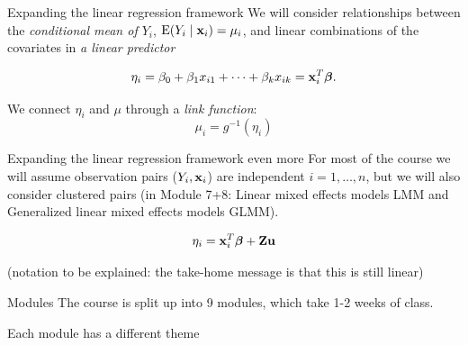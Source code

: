 \documentclass[
  ignorenonframetext,
]{beamer}
\begin{document}
\begin{frame}
\begin{block}{Expanding the linear regression framework}
\protect\hypertarget{expanding-the-linear-regression-framework}{}
We will consider relationships between the \emph{conditional mean of
\(Y_i\)}, \(\text{E}(Y_i\mid {\bf x}_i)=\mu_i\), and linear combinations
of the covariates in \emph{a linear predictor}

\[
\eta_i=\beta_0+\beta_1 x_{i1}+\cdots +\beta_k x_{ik}={\bf x}_i^T \boldsymbol{\beta}.
\]

We connect \(\eta_i\) and \(\mu\) through a \emph{link function}:
\[\mu_i = g^{-1}(\eta_i)\]
\end{block}
\end{frame}

\begin{frame}
\begin{block}{Expanding the linear regression framework even more}
\protect\hypertarget{expanding-the-linear-regression-framework-even-more}{}
For most of the course we will assume observation pairs
(\(Y_i,{\bf x}_i\)) are independent \(i=1,\ldots,n\), but we will also
consider clustered pairs (in Module 7+8: Linear mixed effects models LMM
and Generalized linear mixed effects models GLMM).

\[
\eta_i={\bf x}_i^T \boldsymbol{\beta} + \bf{Z} u
\]

(notation to be explained: the take-home message is that this is still
linear)
\end{block}
\end{frame}

\begin{frame}
\begin{block}{Modules}
\protect\hypertarget{modules}{}
The course is split up into 9 modules, which take 1-2 weeks of class.

Each module has a different theme
\end{block}
\end{frame}
\end{document}
